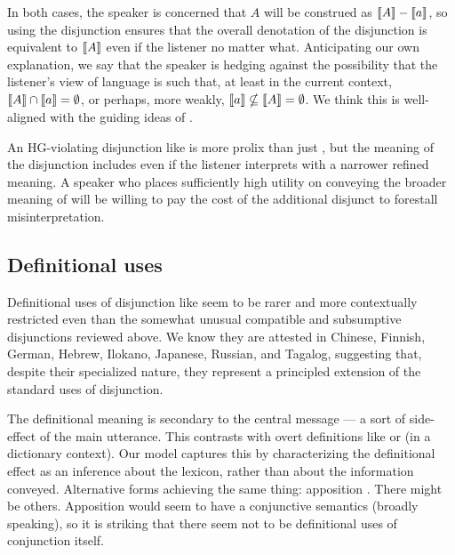 \documentclass{article}
\begin{document}
In both cases, the speaker is concerned that $A$ will be construed as
$\llbracket A\rrbracket-\llbracket a\rrbracket$, so using the disjunction ensures that the overall
denotation of the disjunction is equivalent to $\llbracket A\rrbracket$ even if the
listener no matter what. Anticipating our own explanation, we say that
the speaker is hedging against the possibility that the listener's
view of language is such that, at least in the current context,
$\llbracket A\rrbracket \cap \llbracket a\rrbracket = \emptyset$, or perhaps, more weakly, $ \llbracket a\rrbracket
\nsubseteq \llbracket A\rrbracket = \emptyset$. We think this is well-aligned with
the guiding ideas of \citet{Chemla-HurfordCounts}.

An HG-violating disjunction like  is more prolix
than just , but the meaning of the disjunction includes
 even if the listener interprets  with a
narrower refined meaning.  A speaker who places sufficiently high
utility on conveying the broader meaning of  will be
willing to pay the cost of the additional disjunct to forestall
misinterpretation.
 

\subsection{Definitional uses}\label{sec:data:definitional}

Definitional uses of disjunction like 
seem to be rarer and more contextually restricted even than the
somewhat unusual compatible and subsumptive disjunctions reviewed
above. We know they are attested in Chinese, Finnish, German, Hebrew,
Ilokano, Japanese, Russian, and Tagalog, suggesting that, despite
their specialized nature, they represent a principled extension of the
standard uses of disjunction.

The definitional meaning is secondary to the central message --- a
sort of side-effect of the main utterance. This contrasts with overt
definitions like  or
 (in a dictionary context). Our model
captures this by characterizing the definitional effect as an
inference about the lexicon, rather than about the information
conveyed. Alternative forms achieving the same thing: apposition
. There might be others. Apposition
would seem to have a conjunctive semantics (broadly speaking), so it
is striking that there seem not to be definitional uses of conjunction
itself.
\end{document}
